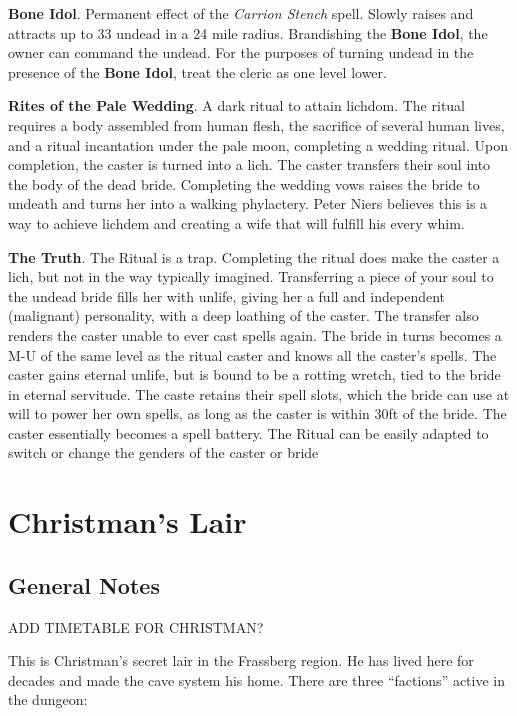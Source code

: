 \documentclass[
]{book}
\begin{document}
\textbf{Bone Idol}. Permanent effect of the \emph{Carrion Stench} spell. Slowly raises and attracts up to 33 undead in a 24 mile radius. Brandishing the \textbf{Bone Idol}, the owner can command the undead. For the purposes of turning undead in the presence of the \textbf{Bone Idol}, treat the cleric as one level lower.

\textbf{Rites of the Pale Wedding}. A dark ritual to attain lichdom. The ritual requires a body assembled from human flesh, the sacrifice of several human lives, and a ritual incantation under the pale moon, completing a wedding ritual. Upon completion, the caster is turned into a lich. The caster transfers their soul into the body of the dead bride. Completing the wedding vows raises the bride to undeath and turns her into a walking phylactery. Peter Niers believes this is a way to achieve lichdem and creating a wife that will fulfill his every whim.

\textbf{The Truth}. The Ritual is a trap. Completing the ritual does make the caster a lich, but not in the way typically imagined. Transferring a piece of your soul to the undead bride fills her with unlife, giving her a full and independent (malignant) personality, with a deep loathing of the caster. The transfer also renders the caster unable to ever cast spells again. The bride in turns becomes a M-U of the same level as the ritual caster and knows all the caster's spells. The caster gains eternal unlife, but is bound to be a rotting wretch, tied to the bride in eternal servitude. The caste retains their spell slots, which the bride can use at will to power her own spells, as long as the caster is within 30ft of the bride. The caster essentially becomes a spell battery. The Ritual can be easily adapted to switch or change the genders of the caster or bride

\chapter{Christman's Lair}\label{lair}

\section{General Notes}\label{general-notes}

ADD TIMETABLE FOR CHRISTMAN?

This is Christman's secret lair in the Frassberg region. He has lived here for decades and made the cave system his home. There are three ``factions'' active in the dungeon:
\end{document}
